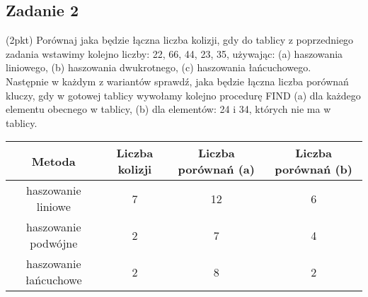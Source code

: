 \documentclass{article}
\begin{document}
\subsection*{Zadanie 2}
(2pkt) Porównaj jaka będzie łączna liczba kolizji, gdy do tablicy z poprzedniego zadania wstawimy kolejno liczby:
22, 66, 44, 23, 35,  używając: (a) haszowania liniowego, (b) haszowania dwukrotnego, (c) haszowania łańcuchowego. \\[1ex]
\noindent
Następnie w każdym z wariantów sprawdź, jaka będzie łączna liczba porównań kluczy, gdy w gotowej tablicy wywołamy
kolejno procedurę FIND (a) dla każdego elementu obecnego w tablicy, (b) dla elementów: 24 i 34, których nie ma w tablicy.
\begin{center}
    \begin{tabular}{c|c|c|c}
        \textbf{Metoda}       & \textbf{Liczba kolizji} & \textbf{Liczba porównań (a)} & \textbf{Liczba porównań (b)} \\
        \hline
        haszowanie liniowe    & 7                       & 12                           & 6                            \\
        haszowanie podwójne   & 2                       & 7                            & 4                            \\
        haszowanie łańcuchowe & 2                       & 8                            & 2
    \end{tabular}
\end{center}

\pagebreak
\end{document}

